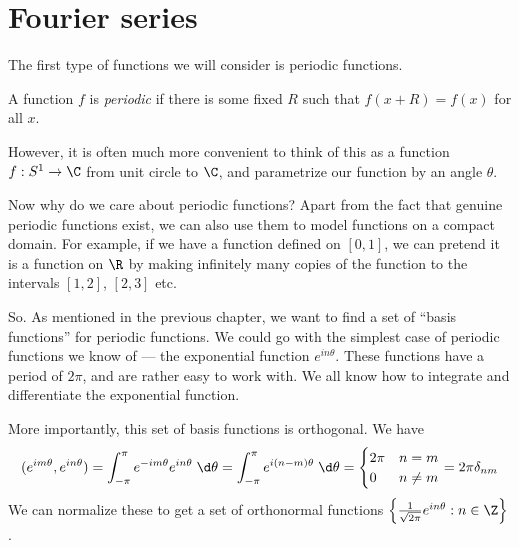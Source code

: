 \documentclass[a4paper]{article}
\begin{document}
\section{Fourier series}
The first type of functions we will consider is periodic functions.
\begin{defi}
  A function $f$ is \emph{periodic} if there is some fixed $R$ such that $f(x + R) = f(x)$ for all $x$.

  However, it is often much more convenient to think of this as a function $f: S^1 \to \C$ from unit circle to $\C$, and parametrize our function by an angle $\theta$.
\end{defi}
Now why do we care about periodic functions? Apart from the fact that genuine periodic functions exist, we can also use them to model functions on a compact domain. For example, if we have a function defined on $[0, 1]$, we can pretend it is a function on $\R$ by making infinitely many copies of the function to the intervals $[1, 2]$, $[2, 3]$ etc.
\begin{center}
\end{center}
So. As mentioned in the previous chapter, we want to find a set of ``basis functions'' for periodic functions. We could go with the simplest case of periodic functions we know of --- the exponential function $e^{in\theta}$. These functions have a period of $2\pi$, and are rather easy to work with. We all know how to integrate and differentiate the exponential function.

More importantly, this set of basis functions is orthogonal. We have
\[
  (e^{im \theta}, e^{in\theta}) = \int_{-\pi}^{\pi} e^{-im\theta} e^{in\theta}\;\d \theta = \int_{-\pi}^\pi e^{i(n - m)\theta}\;\d \theta =
  \begin{cases}
    2\pi & n = m\\
    0    & n\not= m
  \end{cases} = 2\pi \delta_{nm}
\]
We can normalize these to get a set of orthonormal functions $\left\{\frac{1}{\sqrt{2\pi}} e^{in\theta}: n\in \Z\right\}$.
\end{document}
